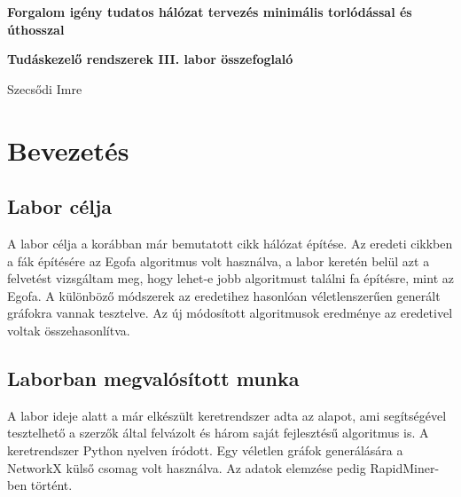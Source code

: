 \documentclass[12pt]{report}
\begin{document}
\begin{titlepage}
	\begin{center}
		\vspace*{1cm}
		
		\textbf{\LARGE 
			Forgalom igény tudatos hálózat tervezés minimális torlódással és úthosszal
		}
	
	
		\vspace{0.5cm}
	
		\textbf{\normalsize Tudáskezelő rendszerek III. labor összefoglaló}
		
		\vfill
		
		\Large Szecsődi Imre
		
		\vspace{2.8cm}
		
		\the\year
		
	\end{center}
\end{titlepage}

\tableofcontents
	
\chapter{Bevezetés}


\section{Labor célja}

A labor célja a korábban már bemutatott cikk\cite{avin_demand-aware_nodate} hálózat építése.
Az eredeti cikkben a fák építésére az Egofa algoritmus volt használva, a labor keretén belül azt a felvetést vizsgáltam meg, hogy lehet-e jobb algoritmust találni fa építésre, mint az Egofa. 
A különböző módszerek az eredetihez hasonlóan véletlenszerűen generált gráfokra vannak tesztelve. 
Az új módosított algoritmusok eredménye az eredetivel voltak összehasonlítva.

\section{Laborban megvalósított munka}

A labor ideje alatt a már elkészült keretrendszer adta az alapot, ami segítségével tesztelhető a szerzők által felvázolt és három saját fejlesztésű algoritmus is.
A keretrendszer Python \cite{noauthor_python_nodate} nyelven íródott.
Egy véletlen gráfok generálására a NetworkX külső csomag volt használva\cite{noauthor_networkx_nodate}.
Az adatok elemzése pedig RapidMiner-ben történt\cite{noauthor_lightning_nodate}.
\end{document}
